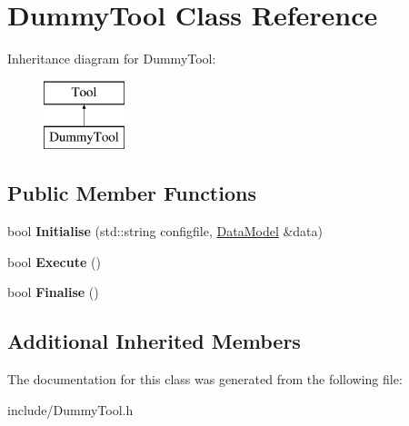\hypertarget{classDummyTool}{\section{Dummy\-Tool Class Reference}
\label{classDummyTool}
}
Inheritance diagram for Dummy\-Tool\-:\begin{figure}[H]
\begin{center}
\leavevmode
\includegraphics[height=2.000000cm]{classDummyTool}
\end{center}
\end{figure}
\subsection*{Public Member Functions}
\begin{DoxyCompactItemize}
\item 
\hypertarget{classDummyTool_a0d9cd781681a06ee3cf0cd1e7bb770a8}{bool {\bfseries Initialise} (std\-::string configfile, \hyperlink{classDataModel}{Data\-Model} \&data)}\label{classDummyTool_a0d9cd781681a06ee3cf0cd1e7bb770a8}

\item 
\hypertarget{classDummyTool_ac107b31f1785c1cc803e0e65be548047}{bool {\bfseries Execute} ()}\label{classDummyTool_ac107b31f1785c1cc803e0e65be548047}

\item 
\hypertarget{classDummyTool_aacb5d0b9906a27c2b4bba4aae9bc093a}{bool {\bfseries Finalise} ()}\label{classDummyTool_aacb5d0b9906a27c2b4bba4aae9bc093a}

\end{DoxyCompactItemize}
\subsection*{Additional Inherited Members}


The documentation for this class was generated from the following file\-:\begin{DoxyCompactItemize}
\item 
include/Dummy\-Tool.\-h\end{DoxyCompactItemize}
